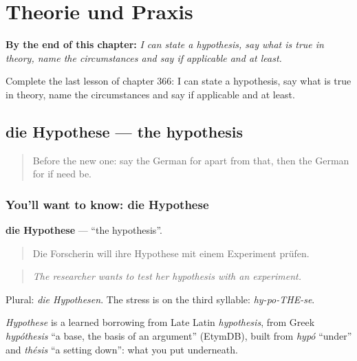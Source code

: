 
\chapter{Theorie und Praxis}
\label{ch:ge-theorie-und-praxis}

\begin{chapteropening}
\textbf{By the end of this chapter:} \emph{I can state a hypothesis, say what is true in theory, name the circumstances and say if applicable and at least.}

Complete the last lesson of chapter 366: I can state a hypothesis, say what is true in theory, name the circumstances and say if applicable and at least.
\end{chapteropening}

\section[die Hypothese]{die Hypothese — the hypothesis}

\label{lesson:GE-C366-hypothese}



\begin{quote}
Before the new one: say the German for apart from that, then the German for if need be.
\end{quote}

\subsection*{You'll want to know: die Hypothese}
\textbf{die Hypothese} — \textquotedblleft{}the hypothesis\textquotedblright{}.

\begin{quote}
Die Forscherin will ihre Hypothese mit einem Experiment prüfen.
\end{quote}

\begin{quote}
\emph{The researcher wants to test her hypothesis with an experiment.}
\end{quote}

Plural: \emph{die Hypothesen}. The stress is on the third syllable: \emph{hy-po-THE-se}.

\begin{cousinweb}
\emph{Hypothese} is a learned borrowing from Late Latin \emph{hypothesis}, from Greek \emph{hypóthesis} \textquotedblleft{}a base, the basis of an argument\textquotedblright{} (EtymDB), built from \emph{hypó} \textquotedblleft{}under\textquotedblright{} and \emph{thésis} \textquotedblleft{}a setting down\textquotedblright{}: what you put underneath.
\end{cousinweb}

